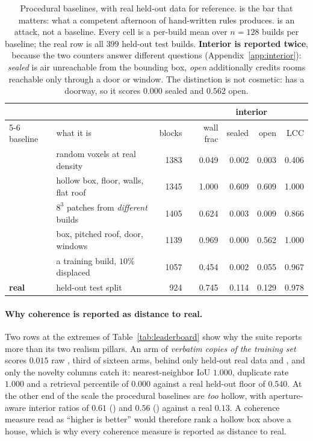 \begin{table}[t]
\centering
\small
\caption{Procedural baselines, with real held-out data for reference.
\gabled{} is the bar that matters: what a competent afternoon of hand-written
rules produces. \patchstitch{} is an attack, not a baseline. Every cell is a
per-build mean over $n{=}128$ builds per baseline; the real row is all $399$
held-out test builds. \textbf{Interior is reported twice}, because the two
counters answer different questions (Appendix~\ref{app:interior}):
\emph{sealed} is air unreachable from the bounding box, \emph{open} additionally
credits rooms reachable only through a door or window. The distinction is not
cosmetic: \gabled{} has a doorway, so it scores $0.000$ sealed and $0.562$
open.}
\label{tab:baselines}
\setlength{\tabcolsep}{4pt}
\begin{tabular}{llrrrrr}
\toprule
& & & & \multicolumn{2}{c}{interior} & \\
\cmidrule(lr){5-6}
baseline & what it is & blocks & wall frac & sealed & open & LCC \\
\midrule
\randomvox{} & random voxels at real density & 1383 & 0.049 & 0.002 & 0.003 & 0.406 \\
\hollowbox{} & hollow box, floor, walls, flat roof & 1345 & 1.000 & 0.609 & 0.609 & 1.000 \\
\patchstitch{} & $8^3$ patches from \emph{different} builds & 1405 & 0.624 & 0.003 & 0.009 & 0.866 \\
\gabled{} & box, pitched roof, door, windows & 1139 & 0.969 & 0.000 & 0.562 & 1.000 \\
\copynoise{} & a training build, $10\%$ displaced & 1057 & 0.454 & 0.002 & 0.055 & 0.967 \\
\midrule
\textbf{real} & held-out test split & 924 & 0.745 & 0.114 & 0.129 & 0.978 \\
\bottomrule
\end{tabular}
\end{table}

\paragraph{Why coherence is reported as distance to real.} Two rows at the extremes of
Table~\ref{tab:leaderboard} show why the suite reports more than its two realism pillars.
An arm of \emph{verbatim copies of the training set} scores $0.015$ raw \mvkid{}, third of
sixteen arms, behind only held-out real data and \solidify{}, and only the novelty columns
catch it: nearest-neighbor IoU $1.000$, duplicate rate $1.000$ and a retrieval percentile
of $0.000$ against a real held-out floor of $0.540$. At the other end of the scale the
procedural baselines are \emph{too} hollow, with aperture-aware interior ratios of $0.61$
(\hollowbox{}) and $0.56$ (\gabled{}) against a real $0.13$. A coherence measure read as
``higher is better'' would therefore rank a hollow box above a house, which is why every
coherence measure is reported as distance to real.

